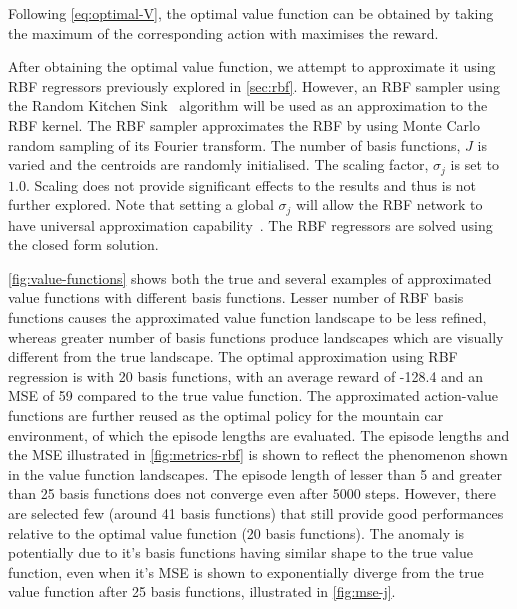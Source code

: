 \documentclass{article}
\begin{document}
Following \cref{eq:optimal-V}, the optimal value function can be obtained by taking the maximum of the corresponding action with maximises the reward.

After obtaining the optimal value function, we attempt to approximate it using RBF regressors previously explored in \cref{sec:rbf}. However, an RBF sampler using the Random Kitchen Sink~\cite{rahimiRandomFeaturesLargeScale} algorithm will be used as an approximation to the RBF kernel. The RBF sampler approximates the RBF by using Monte Carlo random sampling of its Fourier transform. The number of basis functions, $J$ is varied and the centroids are randomly initialised. The scaling factor, $\sigma_j$ is set to $1.0$. Scaling does not provide significant effects to the results and thus is not further explored. Note that setting a global $\sigma_j$ will allow the RBF network to have universal approximation capability~\cite{wuUsingRadialBasis2012}. The RBF regressors are solved using the closed form solution.

\cref{fig:value-functions} shows both the true and several examples of approximated value functions with different basis functions. Lesser number of RBF basis functions causes the approximated value function landscape to be less refined, whereas greater number of basis functions produce landscapes which are visually different from the true landscape. The optimal approximation using RBF regression is with 20 basis functions, with an average reward of -128.4 and an MSE of 59 compared to the true value function. The approximated action-value functions are further reused as the optimal policy for the mountain car environment, of which the episode lengths are evaluated. The episode lengths and the MSE illustrated in \cref{fig:metrics-rbf} is shown to reflect the phenomenon shown in the value function landscapes. The episode length of lesser than 5 and greater than 25 basis functions does not converge even after 5000 steps. However, there are selected few (around 41 basis functions) that still provide good performances relative to the optimal value function (20 basis functions). The anomaly is potentially due to it's basis functions having similar shape to the true value function, even when it's MSE is shown to exponentially diverge from the true value function after 25 basis functions, illustrated in \cref{fig:mse-j}.
\end{document}
